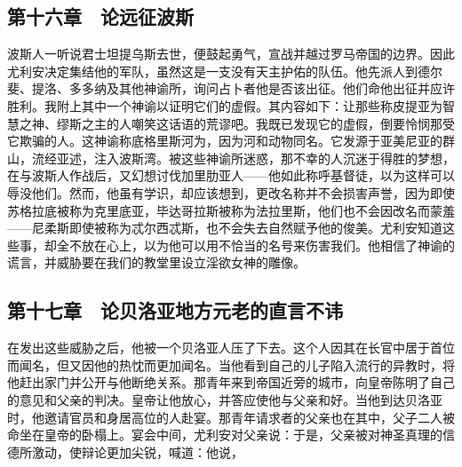 
\subsection{第十六章　论远征波斯}

波斯人一听说君士坦提乌斯去世，便鼓起勇气，宣战并越过罗马帝国的边界。因此尤利安决定集结他的军队，虽然这是一支没有天主护佑的队伍。他先派人到德尔斐、提洛、多多纳及其他神谕所，询问占卜者他是否该出征。他们命他出征并应许胜利。我附上其中一个神谕以证明它们的虚假。其内容如下：让那些称皮提亚为智慧之神、缪斯之主的人嘲笑这话语的荒谬吧。我既已发现它的虚假，倒要怜悯那受它欺骗的人。这神谕称底格里斯河为，因为河和动物同名。它发源于亚美尼亚的群山，流经亚述，注入波斯湾。被这些神谕所迷惑，那不幸的人沉迷于得胜的梦想，在与波斯人作战后，又幻想讨伐加里肋亚人——他如此称呼基督徒，以为这样可以辱没他们。然而，他虽有学识，却应该想到，更改名称并不会损害声誉，因为即使苏格拉底被称为克里底亚，毕达哥拉斯被称为法拉里斯，他们也不会因改名而蒙羞——尼柔斯即使被称为忒尔西忒斯，也不会失去自然赋予他的俊美。尤利安知道这些事，却全不放在心上，以为他可以用不恰当的名号来伤害我们。他相信了神谕的谎言，并威胁要在我们的教堂里设立淫欲女神的雕像。\par


\subsection{第十七章　论贝洛亚地方元老的直言不讳}

在发出这些威胁之后，他被一个贝洛亚人压了下去。这个人因其在长官中居于首位而闻名，但又因他的热忱而更加闻名。当他看到自己的儿子陷入流行的异教时，将他赶出家门并公开与他断绝关系。那青年来到帝国近旁的城市，向皇帝陈明了自己的意见和父亲的判决。皇帝让他放心，并答应使他与父亲和好。当他到达贝洛亚时，他邀请官员和身居高位的人赴宴。那青年请求者的父亲也在其中，父子二人被命坐在皇帝的卧榻上。宴会中间，尤利安对父亲说：于是，父亲被对神圣真理的信德所激动，使辩论更加尖锐，喊道：他说，\par

